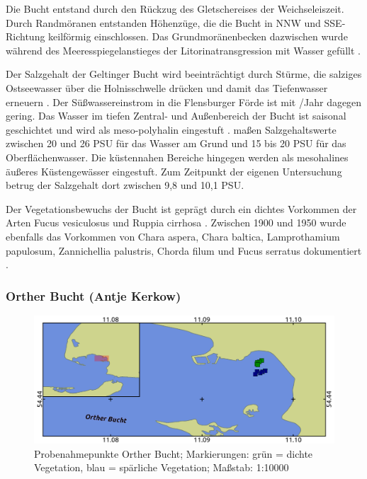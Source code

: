 Die Bucht entstand durch den Rückzug des Gletschereises der Weichseleiszeit. Durch Randmöranen entstanden Höhenzüge, die die Bucht in NNW und SSE-Richtung keilförmig einschlossen. Das Grundmoränenbecken dazwischen wurde während des Meeresspiegelanstieges der Litorinatransgression mit Wasser gefüllt \citep{reisch_1997}.

Der Salzgehalt der Geltinger Bucht wird beeinträchtigt durch Stürme, die salziges Ostseewasser über die Holnisschwelle drücken und damit das Tiefenwasser erneuern \citep{nikulina_2009}. Der Süßwassereinstrom  in die Flensburger Förde ist mit \unit{}{\kilo\cubic\metre}/Jahr \citep{lanu_2001} dagegen gering.
Das Wasser im tiefen Zentral- und Außenbereich der Bucht ist saisonal geschichtet und wird als meso-polyhalin eingestuft \citep{reimers_2005}. \cite{kandler_1963,exon_1972 and bluhm_1990} maßen Salzgehaltswerte zwischen 20 und 26 PSU für das Wasser am Grund und 15 bis 20 PSU für das Oberflächenwasser. Die küstennahen Bereiche hingegen werden als mesohalines äußeres Küstengewässer eingestuft. Zum Zeitpunkt der eigenen Untersuchung betrug der Salzgehalt dort zwischen 9,8 und 10,1 PSU.

Der Vegetationsbewuchs der Bucht ist geprägt durch ein dichtes Vorkommen der Arten Fucus vesiculosus und Ruppia cirrhosa . Zwischen 1900 und 1950 wurde ebenfalls das Vorkommen von Chara aspera, Chara baltica, Lamprothamium papulosum, Zannichellia palustris, Chorda filum und Fucus serratus dokumentiert \citep{mertens_2007}.


\subsubsection{Orther Bucht (Antje Kerkow)}

\begin{figure}[htb]
\centering
\includegraphics[width=1\textwidth]{images/OB}
\caption[Probenahmepunkte Orther Bucht]{Probenahmepunkte Orther Bucht; Markierungen: grün = dichte Vegetation, blau = spärliche Vegetation; Maßstab: 1:10000}
\label{OB}
\end{figure}




